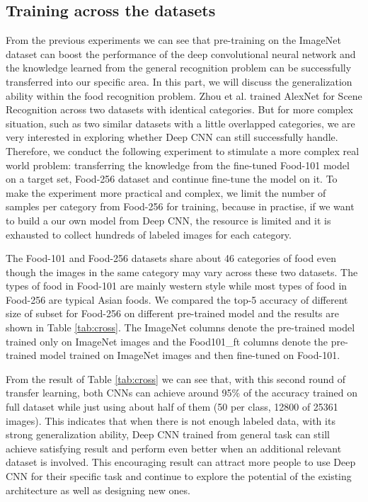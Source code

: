 \subsection{Training across the datasets}
From the previous experiments we can see that pre-training on the ImageNet dataset can boost the performance of the deep convolutional neural network and the knowledge learned from the general recognition problem can be successfully transferred into our specific area. In this part, we will discuss the generalization ability within the food recognition problem.  Zhou et al. trained AlexNet for Scene Recognition across two datasets with identical categories\cite{NIPS2014_Zhou}. But for more complex situation, such as two similar datasets with a little overlapped categories, we are very interested in exploring whether Deep CNN can still successfully handle. Therefore, we conduct the following experiment to stimulate a more complex real world problem: transferring the knowledge from the fine-tuned Food-101 model on a target set, Food-256 dataset and continue fine-tune the model on it. To make the experiment more practical and complex, we limit the number of samples per category from Food-256 for training, because in practise, if we want to build a our own model from Deep CNN, the resource is limited and it is exhausted to collect hundreds of labeled images for each category.

The Food-101 and Food-256 datasets share about 46 categories of food even though the images in the same category may vary across these two datasets. The types of food in Food-101 are mainly western style while most types of food in Food-256 are typical Asian foods. We compared the top-5 accuracy of different size of subset for Food-256 on different pre-trained model and the results are shown in Table \ref{tab:cross}. The ImageNet columns denote the pre-trained model trained only on ImageNet images and the Food101\_ft columns denote the pre-trained model trained on ImageNet images and then fine-tuned on Food-101.

From the result of Table \ref{tab:cross} we can see that, with this second round of transfer learning, both CNNs can achieve around 95\% of the accuracy trained on full dataset while just using about half of them (50 per class, 12800 of 25361 images). This indicates that when there is not enough labeled data, with its strong generalization ability, Deep CNN trained from general task can still achieve satisfying result and perform even better when an additional relevant dataset is involved. This encouraging result can attract more people to use Deep CNN for their specific task and continue to explore the potential of the existing architecture as well as designing new ones.

